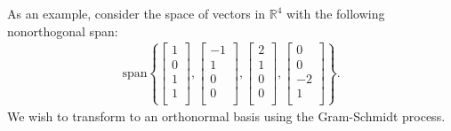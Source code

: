 As an example, consider the space of vectors in $\mathbb{R}^4$ with the following nonorthogonal span:
\begin{align}
  \text{span} \left\{
  \left[ \begin{array}{c}  1 \\  0 \\  1 \\  1 \\ \end{array} \right] ,
  \left[ \begin{array}{c} -1 \\  1 \\  0 \\  0 \\ \end{array} \right] ,
  \left[ \begin{array}{c}  2 \\  1 \\  0 \\  0 \\ \end{array} \right] ,
  \left[ \begin{array}{c}  0 \\  0 \\ -2 \\  1 \\ \end{array} \right] \right\} . \nonumber
\end{align}
We wish to transform to an orthonormal basis using the Gram-Schmidt process.

